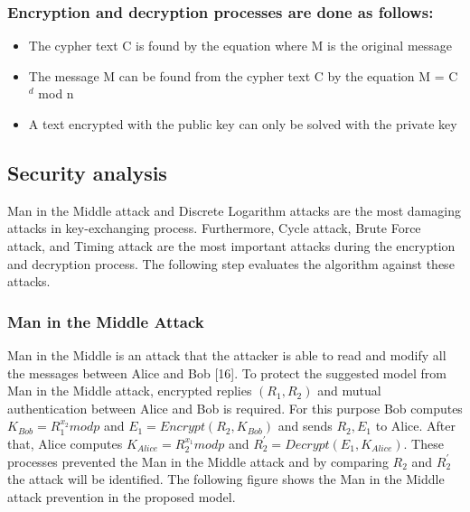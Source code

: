 \subsubsection{Encryption and decryption processes are done as follows:}
\vspace{-18pt}
\begin{itemize}
	\item The cypher text C is found by the equation where M is the original
	      message
	\item The message M can be found from the cypher text C by the equation M = C$^d$ mod n
	\item A text encrypted with the public key can only be solved with the private key
\end{itemize}
\pagebreak


\subsection{Security analysis}
Man in the Middle attack and Discrete Logarithm attacks
are the most damaging attacks in key-exchanging process.
Furthermore, Cycle attack, Brute Force attack, and Timing
attack are the most important attacks during the encryption
and decryption process. The following step evaluates the
algorithm against these attacks.
\subsubsection{Man in the Middle Attack}
Man in the Middle is an attack that the attacker is able to
read and modify all the messages between Alice and Bob [16].
To protect the suggested model from Man in the Middle
attack, encrypted replies $(R_{1},R_{2})$ and mutual
authentication between Alice  and Bob  is
required. For this purpose Bob computes
$K_{Bob} = R_{1}^{x_{2}} mod p$
and $E_{1}=Encrypt(R_{2},K_{Bob})$ and sends $ R_{2},E_{1}$ to Alice.
After that, Alice computes $K_{Alice} = R_{2}^{x_{1}} mod p$
and $R^{'}_{2}=Decrypt(E_{1},K_{Alice}).$
These processes prevented the Man in the Middle attack and by comparing $R_{2}$ and $R^{'}_{2}$ the attack will be identified. The following figure shows the Man in the Middle attack prevention in the proposed model.

